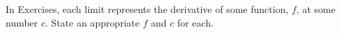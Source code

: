 \begin{exerciseset}{In Exercises}{, each limit represents the derivative of some function, $f$, at some number $c$. State an appropriate $f$ and $c$ for each.}





\end{exerciseset}
